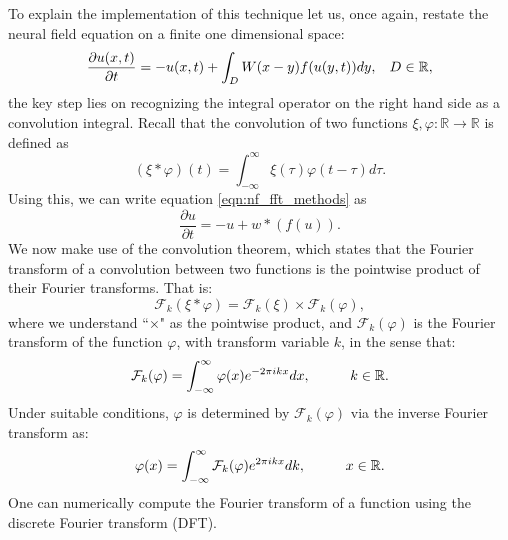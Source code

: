 \documentclass{uonmathreport}
\begin{document}
To explain the implementation of this technique let us, once again, restate the neural field equation on a finite one dimensional space:
\begin{equation}\label{eqn:nf_fft_methods}
\frac{\partial u(x,t)}{\partial t} = -u(x,t) +
\int_{D} W(x-y)f(u(y,t))dy, \hspace{3mm} D \in \mathbb{R},
\end{equation}
the key step lies on recognizing the integral operator on the right hand side as a convolution integral. Recall that the convolution of two functions $\xi, \varphi: \mathbb{R} \rightarrow \mathbb{R}$ is defined as 
\begin{equation}\label{eqn:convolution_definition}
(\xi * \varphi)(t) = \int_{-\infty}^{\infty} \xi(\tau)\varphi(t-\tau) d\tau.
\end{equation}
Using this, we can write equation \ref{eqn:nf_fft_methods} as
\begin{equation}\label{eqn:nf_fft_convolution}
\frac{\partial u}{\partial t} = -u + w * (f(u)).
\end{equation}
We now make use of the convolution theorem, which states that the Fourier transform of a convolution between two functions is the pointwise product of their Fourier transforms. That is:
\begin{equation}\label{eqn: convolution_theorem}
\mathcal{F}_k(\xi*\varphi) = \mathcal{F}_k(\xi) \times \mathcal{F}_k(\varphi),
\end{equation}
where we understand ``$\times$" as the pointwise product, and $\mathcal{F}_k(\varphi)$ is the Fourier transform of the function $\varphi$, with transform variable $k$, in the sense that:
\begin{equation}\label{eqn:fourier_transform}
\mathcal{F}_k(\varphi) = \int_{-\infty}^{\infty} \varphi(x)e^{-2\pi ikx} dx, \hspace{10mm} k \in \mathbb{R}.
\end{equation}
Under suitable conditions, $\varphi$ is determined by $\mathcal{F}_k(\varphi)$ via the inverse Fourier transform as:
\begin{equation}\label{eqn:inverse_fourier_transform}
\varphi(x) = \int_{-\infty}^{\infty} \mathcal{F}_k(\varphi) e^{2\pi ikx} dk, \hspace{10mm} x \in \mathbb{R}.
\end{equation}
One can numerically compute the Fourier transform of a function using the discrete Fourier transform (DFT).
\end{document}
